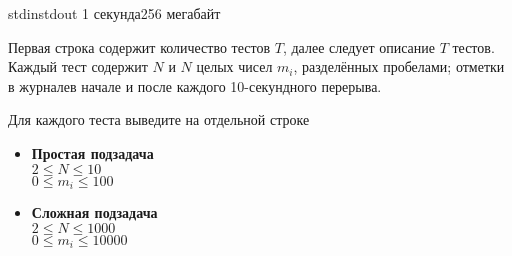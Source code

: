 
\begin{problem}{}
{stdin}{stdout}
{1 секунда}{256 мегабайт}{}

\InputFile

Первая строка содержит количество тестов $T$, далее следует описание $T$ тестов.
Каждый тест содержит $N$ и $N$ целых чисел $m_i$, разделённых пробелами; отметки в журналев начале и после каждого 10-секундного перерыва.

\OutputFile

Для каждого теста выведите на отдельной строке 
\Scoring

\begin{itemize}
  \item {\bf Простая подзадача} \\
	$2 \le N \le 10$ \\
	$0 \le m_i \le 100$
  \item {\bf Сложная подзадача} \\
	$2 \le N \le 1000$ \\
	$0 \le m_i \le 10000$
\end{itemize}

\Examples

\begin{example}
\exmp{
}{
}%
\end{example}

\end{problem}
